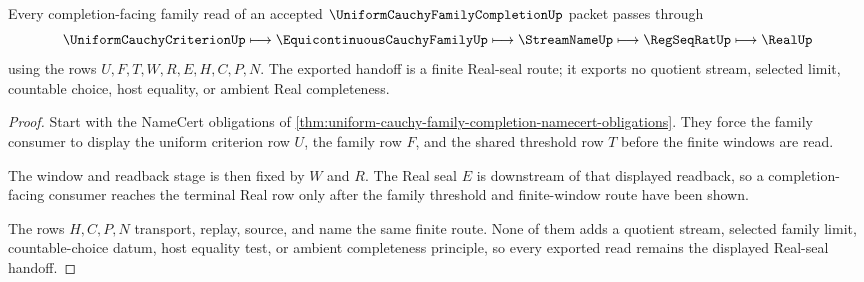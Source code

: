 \begin{theorem}
\label{thm:uniform-cauchy-family-completion-real-seal-handoff}
Every completion-facing family read of an accepted $\UniformCauchyFamilyCompletionUp$ packet passes through
$$
\UniformCauchyCriterionUp
\longmapsto
\EquicontinuousCauchyFamilyUp
\longmapsto
\StreamNameUp
\longmapsto
\RegSeqRatUp
\longmapsto
\RealUp
$$
using the rows $U,F,T,W,R,E,H,C,P,N$. The exported handoff is a finite Real-seal route; it exports no quotient stream, selected limit, countable choice, host equality, or ambient Real completeness.
\end{theorem}
\begin{proof}
Start with the NameCert obligations of \autoref{thm:uniform-cauchy-family-completion-namecert-obligations}. They force the family consumer to display the uniform criterion row $U$, the family row $F$, and the shared threshold row $T$ before the finite windows are read.

The window and readback stage is then fixed by $W$ and $R$. The Real seal $E$ is downstream of that displayed readback, so a completion-facing consumer reaches the terminal Real row only after the family threshold and finite-window route have been shown.

The rows $H,C,P,N$ transport, replay, source, and name the same finite route. None of them adds a quotient stream, selected family limit, countable-choice datum, host equality test, or ambient completeness principle, so every exported read remains the displayed Real-seal handoff.
\end{proof}




